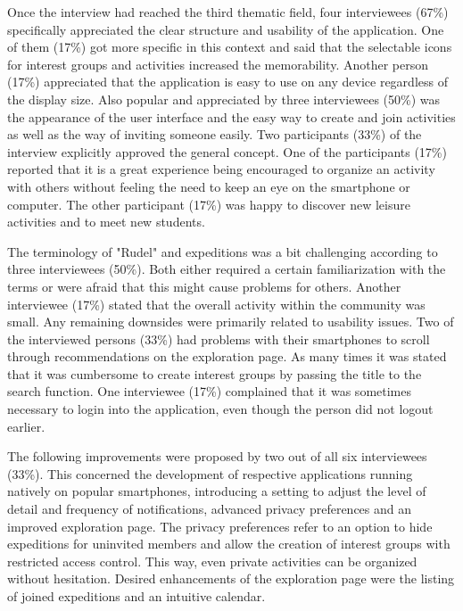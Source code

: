 \documentclass[12pt,numbers=noenddot,parskip,bibliography=totocnumbered,listof=totocnumbered,draft]{scrreprt}
\begin{document}
Once the interview had reached the third thematic field, four interviewees (67\%) specifically appreciated the clear structure and usability of the application. One of them (17\%) got more specific in this context and said that the selectable icons for interest groups and activities increased the memorability. Another person (17\%) appreciated that the application is easy to use on any device regardless of the display size. Also popular and appreciated by three interviewees (50\%) was the appearance of the user interface and the easy way to create and join activities as well as the way of inviting someone easily. Two participants (33\%) of the interview explicitly approved the general concept. One of the participants (17\%) reported that it is a great experience being encouraged to organize an activity with others without feeling the need to keep an eye on the smartphone or computer. The other participant (17\%) was happy to discover new leisure activities and to meet new students.

The terminology of "Rudel" and expeditions was a bit challenging according to three interviewees (50\%). Both either required a certain familiarization with the terms or were afraid that this might cause problems for others. Another interviewee (17\%) stated that the overall activity within the community was small. Any remaining downsides were primarily related to usability issues. Two of the interviewed persons (33\%) had problems with their smartphones to scroll through recommendations on the exploration page. As many times it was stated that it was cumbersome to create interest groups by passing the title to the search function. One interviewee (17\%) complained that it was sometimes necessary to login into the application, even though the person did not logout earlier.

The following improvements were proposed by two out of all six interviewees (33\%). This concerned the development of respective applications running natively on popular smartphones, introducing a setting to adjust the level of detail and frequency of notifications, advanced privacy preferences and an improved exploration page. The privacy preferences refer to an option to hide expeditions for uninvited members and allow the creation of interest groups with restricted access control. This way, even private activities can be organized without hesitation. Desired enhancements of the exploration page were the listing of joined expeditions and an intuitive calendar.
\end{document}
